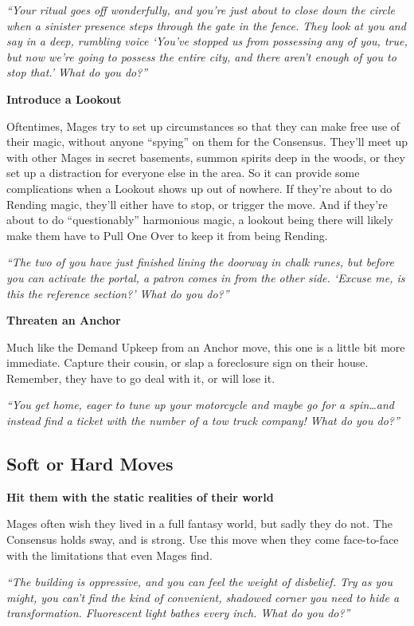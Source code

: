 \documentclass[
]{memoir}
\begin{document}
\emph{``Your ritual goes off wonderfully, and you're just about to close
down the circle when a sinister presence steps through the gate in the
fence. They look at you and say in a deep, rumbling voice `You've
stopped us from possessing any of you, true, but now we're going to
possess the entire city, and there aren't enough of you to stop that.'
What do you do?''}

\textbf{Introduce a Lookout}

Oftentimes, Mages try to set up circumstances so that they can make free
use of their magic, without anyone ``spying'' on them for the Consensus.
They'll meet up with other Mages in secret basements, summon spirits
deep in the woods, or they set up a distraction for everyone else in the
area. So it can provide some complications when a Lookout shows up out
of nowhere. If they're about to do Rending magic, they'll either have to
stop, or trigger the move. And if they're about to do ``questionably''
harmonious magic, a lookout being there will likely make them have to
Pull One Over to keep it from being Rending.

\emph{``The two of you have just finished lining the doorway in chalk
runes, but before you can activate the portal, a patron comes in from
the other side. `Excuse me, is this the reference section?' What do you
do?''}

\textbf{Threaten an Anchor}

Much like the Demand Upkeep from an Anchor move, this one is a little
bit more immediate. Capture their cousin, or slap a foreclosure sign on
their house. Remember, they have to go deal with it, or will lose it.

\emph{``You get home, eager to tune up your motorcycle and maybe go for
a spin\ldots and instead find a ticket with the number of a tow truck
company! What do you do?''}

\hypertarget{soft-or-hard-moves}{%
\subsection{Soft or Hard Moves}\label{soft-or-hard-moves}}

\textbf{Hit them with the static realities of their world}

Mages often wish they lived in a full fantasy world, but sadly they do
not. The Consensus holds sway, and is strong. Use this move when they
come face-to-face with the limitations that even Mages find.

\emph{``The building is oppressive, and you can feel the weight of
disbelief. Try as you might, you can't find the kind of convenient,
shadowed corner you need to hide a transformation. Fluorescent light
bathes every inch. What do you do?''}
\end{document}
